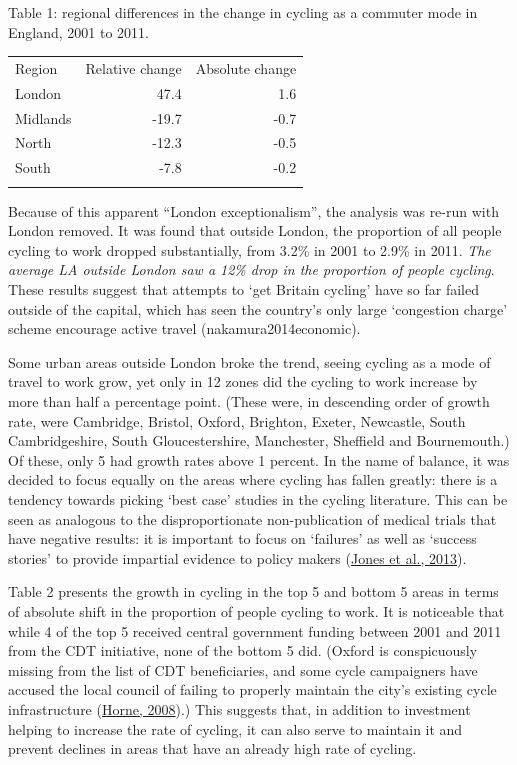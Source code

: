 Table 1: regional differences in the change in cycling as a commuter
mode in England, 2001 to 2011.

\begin{longtable}[c]{@{}lrr@{}}
\toprule\addlinespace
Region & Relative change & Absolute change
\\\addlinespace
\midrule\endhead
London & 47.4 & 1.6
\\\addlinespace
Midlands & -19.7 & -0.7
\\\addlinespace
North & -12.3 & -0.5
\\\addlinespace
South & -7.8 & -0.2
\\\addlinespace
\bottomrule
\end{longtable}

Because of this apparent ``London exceptionalism'', the analysis was
re-run with London removed. It was found that outside London, the
proportion of all people cycling to work dropped substantially, from
3.2\% in 2001 to 2.9\% in 2011. \emph{The average LA outside London saw
a 12\% drop in the proportion of people cycling}. These results suggest
that attempts to `get Britain cycling' have so far failed outside of the
capital, which has seen the country's only large `congestion charge'
scheme encourage active travel (nakamura2014economic).

Some urban areas outside London broke the trend, seeing cycling as a
mode of travel to work grow, yet only in 12 zones did the cycling to
work increase by more than half a percentage point. (These were, in
descending order of growth rate, were Cambridge, Bristol, Oxford,
Brighton, Exeter, Newcastle, South Cambridgeshire, South
Gloucestershire, Manchester, Sheffield and Bournemouth.) Of these, only
5 had growth rates above 1 percent. In the name of balance, it was
decided to focus equally on the areas where cycling has fallen greatly:
there is a tendency towards picking `best case' studies in the cycling
literature. This can be seen as analogous to the disproportionate
non-publication of medical trials that have negative results: it is
important to focus on `failures' as well as `success stories' to provide
impartial evidence to policy makers
(\href{http://www.bmj.com/content/347/bmj.f6104?tab=citation}{Jones et
al., 2013}).

Table 2 presents the growth in cycling in the top 5 and bottom 5 areas
in terms of absolute shift in the proportion of people cycling to work.
It is noticeable that while 4 of the top 5 received central government
funding between 2001 and 2011 from the CDT initiative, none of the
bottom 5 did. (Oxford is conspicuously missing from the list of CDT
beneficiaries, and some cycle campaigners have accused the local council
of failing to properly maintain the city's existing cycle infrastructure
(\href{http://www.oxfordmail.co.uk/news/2296153.print/}{Horne, 2008}).)
This suggests that, in addition to investment helping to increase the
rate of cycling, it can also serve to maintain it and prevent declines
in areas that have an already high rate of cycling.

